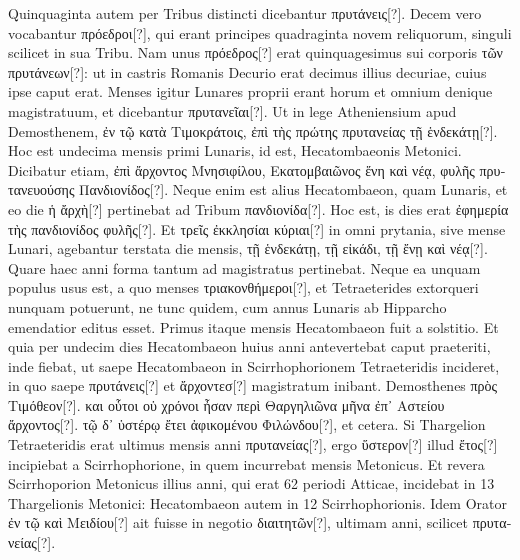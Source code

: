 Quinquaginta autem
per Tribus distincti dicebantur \textgreek{πρυτάνεις[?]}.
Decem vero vocabantur
\textgreek{πρόεδροι[?]}, qui erant principes quadraginta novem
 reliquorum, singuli
scilicet in sua Tribu.
Nam unus \textgreek{πρόεδρος[?]} erat quinquagesimus sui
corporis \textgreek{τῶν πρυτάνεων[?]}: ut in castris Romanis Decurio erat
 decimus
illius decuriae, cuius ipse caput erat.
Menses igitur Lunares proprii
erant horum et omnium denique magistratuum, et dicebantur
 \textgreek{πρυτανεῖαι[?]}.
Ut in lege Atheniensium apud Demosthenem,
 \textgreek{ἐν τῷ κατὰ Τιμοκράτοις,
ἐπὶ τὴς πρώτης πρυτανείας τῇ ἑνδεκάτῃ[?]}.
Hoc est undecima mensis
primi Lunaris, id est, Hecatombaeonis Metonici.
Dicibatur etiam,
\textgreek{ἐπὶ ἄρχοντος Μνησιφίλου, Εκατομβαιῶνος ἕνη καὶ νέᾳ,
 φυλῆς πρυτανευούσης
Πανδιονίδος[?]}.
Neque enim est alius Hecatombaeon, quam Lunaris, et eo
die \textgreek{ἡ ἄρχὴ[?]} pertinebat ad Tribum \textgreek{πανδιονίδα[?]}.
Hoc est, is dies erat \textgreek{ἐφημερία
τὴς πανδιονίδος φυλῆς[?]}.
Et \textgreek{τρεῖς ἐκκλησίαι κύριαι[?]} in omni prytania, sive
mense Lunari, agebantur terstata die mensis,
 \textgreek{τῇ ἑνδεκάτῃ, τῇ εἰκάδι, τῇ
ἔνῃ καὶ νέᾳ[?]}.
Quare haec anni forma tantum ad magistratus pertinebat.
Neque
ea unquam populus usus est, a quo menses \textgreek{τριακονθήμεροι[?]},
 et Tetraeterides
extorqueri nunquam potuerunt, ne tunc quidem, cum annus Lunaris
ab Hipparcho emendatior editus esset.
Primus itaque mensis Hecatombaeon
fuit a solstitio.
Et quia per undecim dies Hecatombaeon
huius anni antevertebat caput praeteriti, inde fiebat, ut saepe Hecatombaeon
in Scirrhophorionem Tetraeteridis incideret, in quo saepe
 \textgreek{πρυτάνεις[?]}
et \textgreek{ἄρχοντεσ[?]} magistratum inibant.
Demosthenes \textgreek{πρὸς Τιμόθεον[?]}.
\textgreek{και οὗτοι
οὑ χρόνοι ἦσαν περὶ Θαργηλιῶνα μῆνα ἐπ᾽ Αστείου ἄρχοντος[?]}.
\textgreek{τῷ δ᾽ ὑστέρῳ ἔτει ἀφικομένου
Φιλώνδου[?]}, et cetera.
Si Thargelion Tetraeteridis erat ultimus mensis anni
\textgreek{πρυτανείας[?]}, ergo \textgreek{ὕστερον[?]} illud
 \textgreek{ἔτος[?]} incipiebat a Scirrhophorione, in
quem incurrebat mensis Metonicus.
Et revera Scirrhoporion Metonicus
illius anni, qui erat 62 periodi Atticae, incidebat in 13 Thargelionis
Metonici: Hecatombaeon autem in 12 Scirrhophorionis.
Idem Orator
\textgreek{ἐν τῷ καὶ Μειδίου[?]} ait fuisse in negotio
\textgreek{διαιτητῶν[?]}, ultimam anni, scilicet \textgreek{πρυτανείας[?]}.
